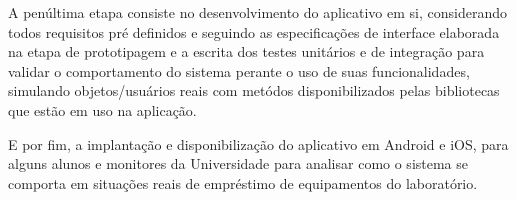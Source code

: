     A penúltima etapa consiste no desenvolvimento do aplicativo em si, considerando todos requisitos pré definidos e seguindo as especificações de interface elaborada na etapa de prototipagem e a escrita dos testes unitários e de integração para validar o comportamento do sistema perante o uso de suas funcionalidades, simulando objetos/usuários reais com metódos disponibilizados pelas bibliotecas que estão em uso na aplicação.
    
    E por fim, a implantação e disponibilização do aplicativo em Android e iOS, para alguns alunos e monitores da Universidade para analisar como o sistema se comporta em situações reais de empréstimo de equipamentos do laboratório. %
    


